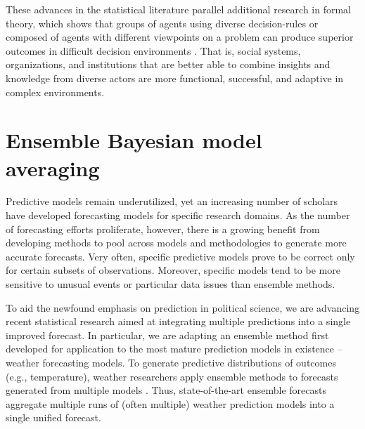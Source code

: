 These advances in the statistical literature parallel additional
research in formal theory, which shows that groups of agents using
diverse decision-rules or composed of agents with different viewpoints
on a problem can produce superior outcomes in difficult decision
environments \citep{Page:2007, Page:2008, Page:2011}.  That is, social
systems, organizations, and institutions that are better able to
combine insights and knowledge from diverse actors are more
functional, successful, and adaptive in complex environments.


\section{Ensemble Bayesian model averaging} 

Predictive models remain underutilized, yet an increasing number of
scholars have developed forecasting models for specific research
domains.  As the number of forecasting efforts proliferate, however,
there is a growing benefit from developing methods to pool across
models and methodologies to generate more accurate forecasts.  Very
often, specific predictive models prove to be correct only for certain
subsets of observations.  Moreover, specific models tend to be more
sensitive to unusual events or particular data issues than ensemble
methods.

To aid the newfound emphasis on prediction in political science, we
are advancing recent statistical research aimed at integrating
multiple predictions into a single improved forecast.  In particular,
we are adapting an ensemble method first developed for application to
the most mature prediction models in existence -- weather forecasting
models.  To generate predictive distributions of outcomes (e.g.,
temperature), weather researchers apply ensemble methods to forecasts
generated from multiple models \citep{Raftery:2005}.  Thus,
state-of-the-art ensemble forecasts aggregate multiple runs of (often
multiple) weather prediction models into a single unified forecast.

